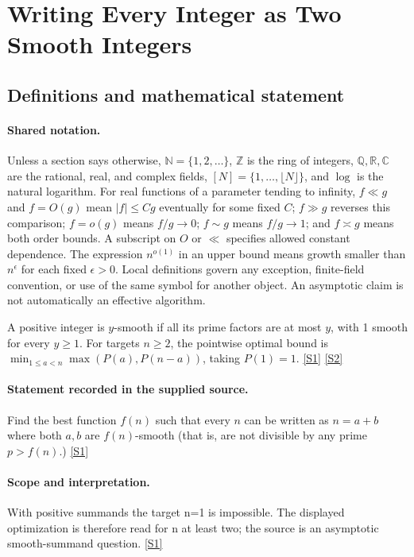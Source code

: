 \documentclass[11pt,a4paper]{article}
\newcommand{\N}{\mathbb{N}}
\newcommand{\Z}{\mathbb{Z}}
\newcommand{\Q}{\mathbb{Q}}
\newcommand{\R}{\mathbb{R}}
\newcommand{\C}{\mathbb{C}}
\newcommand{\sref}[2]{\hyperlink{source:#1:#2}{[S#2]}}
\begin{document}
\section{Writing Every Integer as Two Smooth Integers}\label{statement}


\subsection{Definitions and mathematical statement}

\paragraph{Shared notation.}Unless a section says otherwise, $\N=\{1,2,\ldots\}$,
$\Z$ is the ring of integers, $\Q,\R,\C$ are the rational, real, and complex
fields, $[N]=\{1,\ldots,\lfloor N\rfloor\}$, and $\log$ is the natural
logarithm. For real functions of a parameter tending to infinity,
$f\ll g$ and $f=O(g)$ mean $|f|\leq Cg$ eventually for some fixed $C$;
$f\gg g$ reverses this comparison; $f=o(g)$ means $f/g\to0$;
$f\sim g$ means $f/g\to1$; and $f\asymp g$ means both order bounds.
A subscript on $O$ or $\ll$ specifies allowed constant dependence.
The expression $n^{o(1)}$ in an upper bound means growth smaller than
$n^\epsilon$ for each fixed $\epsilon>0$. Local definitions govern any
exception, finite-field convention, or use of the same symbol for another
object. An asymptotic claim is not automatically an effective algorithm.



A positive integer is $y$-smooth if all its prime factors are at most $y$, with 1 smooth for every $y\geq1$. For targets $n\geq2$, the pointwise optimal bound is $\min_{1\leq a<n}\max(P(a),P(n-a))$, taking $P(1)=1$. \sref{statement}{1} \sref{statement}{2}

\paragraph{Statement recorded in the supplied source.}
Find the best function $f(n)$ such that every $n$ can be written as $n=a+b$ where both $a,b$ are $f(n)$-smooth (that is, are not divisible by any prime $p>f(n)$.) \sref{statement}{1}

\paragraph{Scope and interpretation.}

With positive summands the target n=1 is impossible. The displayed optimization is therefore read for n at least two; the source is an asymptotic smooth-summand question. \sref{statement}{1}
\end{document}
